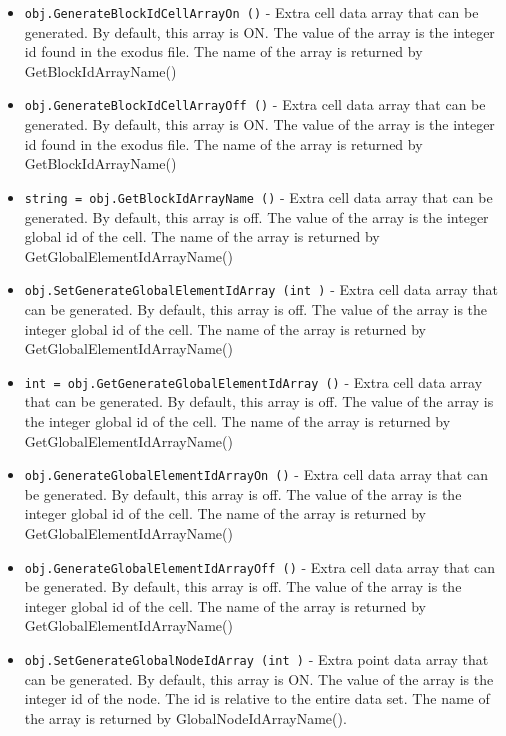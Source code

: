 \begin{itemize}
\item  \verb|obj.GenerateBlockIdCellArrayOn ()| -  Extra cell data array that can be generated.  By default, this array
 is ON.  The value of the array is the integer id found
 in the exodus file. The name of the array is returned by 
 GetBlockIdArrayName()

\item  \verb|obj.GenerateBlockIdCellArrayOff ()| -  Extra cell data array that can be generated.  By default, this array
 is ON.  The value of the array is the integer id found
 in the exodus file. The name of the array is returned by 
 GetBlockIdArrayName()

\item  \verb|string = obj.GetBlockIdArrayName ()| -  Extra cell data array that can be generated.  By default, this array
 is off.  The value of the array is the integer global id of the cell.
 The name of the array is returned by GetGlobalElementIdArrayName()

\item  \verb|obj.SetGenerateGlobalElementIdArray (int )| -  Extra cell data array that can be generated.  By default, this array
 is off.  The value of the array is the integer global id of the cell.
 The name of the array is returned by GetGlobalElementIdArrayName()

\item  \verb|int = obj.GetGenerateGlobalElementIdArray ()| -  Extra cell data array that can be generated.  By default, this array
 is off.  The value of the array is the integer global id of the cell.
 The name of the array is returned by GetGlobalElementIdArrayName()

\item  \verb|obj.GenerateGlobalElementIdArrayOn ()| -  Extra cell data array that can be generated.  By default, this array
 is off.  The value of the array is the integer global id of the cell.
 The name of the array is returned by GetGlobalElementIdArrayName()

\item  \verb|obj.GenerateGlobalElementIdArrayOff ()| -  Extra cell data array that can be generated.  By default, this array
 is off.  The value of the array is the integer global id of the cell.
 The name of the array is returned by GetGlobalElementIdArrayName()

\item  \verb|obj.SetGenerateGlobalNodeIdArray (int )| -  Extra point data array that can be generated.  By default, this array
 is ON.  The value of the array is the integer id of the node.
 The id is relative to the entire data set.
 The name of the array is returned by GlobalNodeIdArrayName().


\end{itemize}
